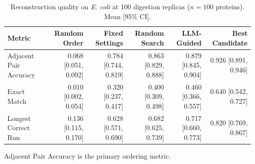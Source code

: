 \begin{table}[!t]
  \centering
  \caption{Reconstruction quality on \textit{E. coli} at 100 digestion replicas ($n=100$ proteins). Mean [95\% CI].}
  \label{tab:main_results}
  \begin{tabular}{lrrrrr}
    \toprule
    Metric & Random Order & Fixed Settings & Random Search & LLM-Guided & Best Candidate \\
    \midrule
    Adjacent Pair Accuracy & 0.068 [0.051, 0.092] & 0.784 [0.744, 0.819] & 0.863 [0.829, 0.888] & 0.879 [0.845, 0.904] & 0.926 [0.891, 0.946] \\
    Exact Match & 0.010 [0.002, 0.054] & 0.320 [0.237, 0.417] & 0.400 [0.309, 0.498] & 0.460 [0.366, 0.557] & 0.640 [0.542, 0.727] \\
    Longest Correct Run & 0.136 [0.115, 0.170] & 0.628 [0.571, 0.690] & 0.682 [0.625, 0.739] & 0.717 [0.660, 0.773] & 0.820 [0.769, 0.867] \\
    \bottomrule
  \end{tabular}
  \par\smallskip\footnotesize{Adjacent Pair Accuracy is the primary ordering metric.}
\end{table}
